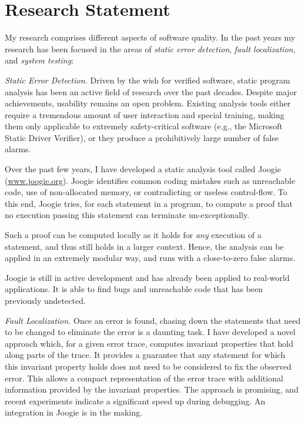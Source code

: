 \section{\sc Research Statement}


My research comprises different aspects of software quality. In the past years
my research has been focused in the areas of \emph{static error detection},
\emph{fault localization}, and \emph{system testing}:

\noindent\emph{Static Error Detection.} Driven by the wish for verified
software, static program analysis has been an active field of research over the
past decades. Despite major achievements, usability remains an open problem.
Existing analysis tools either require a tremendous amount of user interaction
and special training, making them only applicable to extremely safety-critical
software (e.g., the Microsoft Static Driver Verifier), or they produce a
prohibitively large number of false alarms.


Over the past few years, I have developed a static analysis tool called Joogie
(\url{www.joogie.org}). Joogie identifies common coding mistakes such as
unreachable code, use of non-allocated memory, or contradicting or useless 
control-flow. To this end, Joogie tries, for each statement in a program, to
compute a proof that no execution passing this statement can terminate
un-exceptionally.

Such a proof can be computed locally as it holds for \emph{any} execution of
a statement, and thus still holds in a larger context. Hence, the analysis
can be applied in an extremely modular way, and runs with a close-to-zero false
alarms.

Joogie is still in active development and has already been applied to
real-world applications. It is able to find bugs and unreachable code that has been
previously undetected.

\noindent\emph{Fault Localization.} Once an error is found, chasing down the
statements that need to be changed to eliminate the error is a daunting task. I
have developed a novel approach  which, for a given error trace, computes
invariant properties that hold along parts of the trace. It provides a guarantee
that any statement for which this invariant property holds does not need to be
considered to fix the observed error. This allows a compact representation of
the error trace with additional information provided by the invariant
properties. The approach is promising, and recent experiments indicate a
significant speed up during debugging. An integration in Joogie is in the making.

